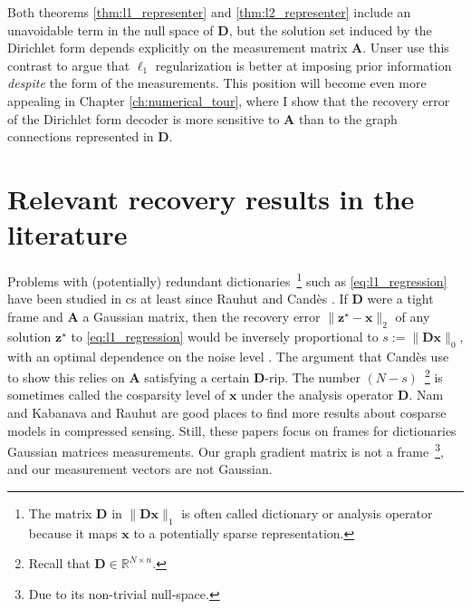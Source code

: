 Both theorems \ref{thm:l1_representer} and \ref{thm:l2_representer} include an unavoidable term in the null space of $\mathbf{D}$, but the solution set induced by the Dirichlet form depends explicitly on the measurement matrix $\mathbf{A}$. Unser \etal \cite{unser2016} use this contrast to argue that $\ell_1$ regularization is better at imposing prior information \emph{despite} the form of the measurements. This position will become even more appealing in Chapter \ref{ch:numerical_tour}, where I show that the recovery error of the Dirichlet form decoder is more sensitive to $\mathbf{A}$ than to the graph connections represented in $\mathbf{D}$.

\section{Relevant recovery results in the literature}

Problems with (potentially) redundant dictionaries~\footnote{The matrix $\mathbf{D}$ in $\|\mathbf{Dx}\|_1$ is often called dictionary or analysis operator because it maps $\mathbf{x}$ to a potentially sparse representation.} such as \eqref{eq:l1_regression} have been studied in \acrlong{cs} at least since Rauhut \etal \cite{rauhut2008} and Cand\`es \etal \cite{candes2011}. If $\mathbf{D}$ were a tight frame and $\mathbf{A}$ a Gaussian matrix, then the recovery error $\|\mathbf{z}^\star - \mathbf{x}\|_2$ of any solution $\mathbf{z}^\star$ to \eqref{eq:l1_regression} would be inversely proportional to $s := \|\mathbf{Dx}\|_0$, with an optimal dependence on the noise level \cite[Theorem 1.2]{candes2011}. The argument that Cand\`es \etal use to show this relies on $\mathbf{A}$ satisfying a certain $\mathbf{D}$-\acrlong{rip}. The number $(N - s)$~\footnote{Recall that $\mathbf{D} \in \mathbb{R}^{N \times n}$.} is sometimes called the cosparsity level of $\mathbf{x}$ under the analysis operator $\mathbf{D}$. Nam \etal \cite{nam2013} and Kabanava and Rauhut \cite{kabanava2015} are good places to find more results about cosparse models in compressed sensing. Still, these papers focus on frames for dictionaries Gaussian matrices measurements. Our graph gradient matrix is not a frame~\footnote{Due to its non-trivial null-space.}, and our measurement vectors are not Gaussian.

